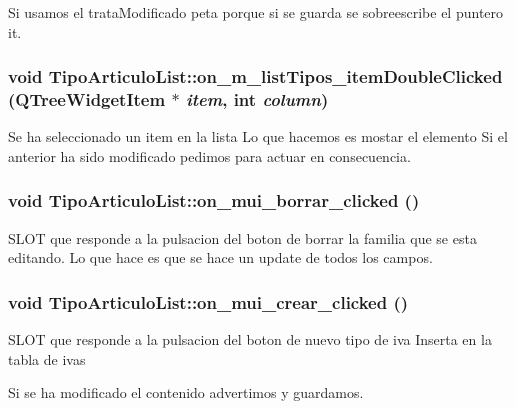 Si usamos el trata\-Modificado peta porque si se guarda se sobreescribe el puntero it. 
\subsubsection{\setlength{\rightskip}{0pt plus 5cm}void Tipo\-Articulo\-List::on\_\-m\_\-list\-Tipos\_\-item\-Double\-Clicked (QTree\-Widget\-Item $\ast$ {\em item}, int {\em column})\hspace{0.3cm}{\tt  [virtual, slot]}}\label{classTipoArticuloList_i2}


Se ha seleccionado un item en la lista Lo que hacemos es mostar el elemento Si el anterior ha sido modificado pedimos para actuar en consecuencia. 
\subsubsection{\setlength{\rightskip}{0pt plus 5cm}void Tipo\-Articulo\-List::on\_\-mui\_\-borrar\_\-clicked ()\hspace{0.3cm}{\tt  [virtual, slot]}}\label{classTipoArticuloList_i4}


SLOT que responde a la pulsacion del boton de borrar la familia que se esta editando. Lo que hace es que se hace un update de todos los campos. 
\subsubsection{\setlength{\rightskip}{0pt plus 5cm}void Tipo\-Articulo\-List::on\_\-mui\_\-crear\_\-clicked ()\hspace{0.3cm}{\tt  [virtual, slot]}}\label{classTipoArticuloList_i5}


SLOT que responde a la pulsacion del boton de nuevo tipo de iva Inserta en la tabla de ivas

Si se ha modificado el contenido advertimos y guardamos. 
